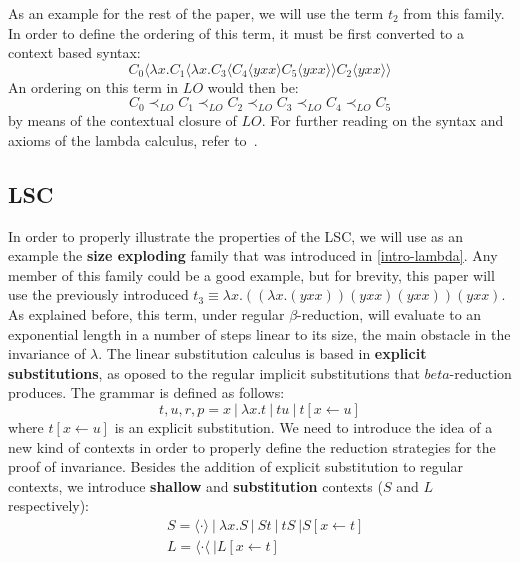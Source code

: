 \documentclass[12pt]{article}
\begin{document}
As an example for the rest of the paper, we will use the term $t_{2}$ from this family. In order to define the ordering of this term, it must be first converted to a context based syntax:
$$C_{0} \langle \lambda x. C_{1} \langle \lambda x. C_{3} \langle C_{4} \langle yxx \rangle C_{5} \langle yxx \rangle \rangle C_{2} \langle yxx \rangle \rangle $$
An ordering on this term in $LO$ would then be:
\begin{equation}
 C_{0} \prec_{LO} C_{1} \prec_{LO} C_{2} \prec_{LO} C_{3} \prec_{LO} C_{4} \prec_{LO} C_{5}
\end{equation}
by means of the contextual closure of $LO$.
For further reading on the syntax and axioms of the lambda calculus, refer to~\cite{barendregt1984lambda}.
\subsection{LSC}
In order to properly illustrate the properties of the LSC, we will use as an example the \textbf{size exploding} family that was introduced in \ref{intro-lambda}. Any member of this family could be a good example, but for brevity, this paper will use the previously introduced $t_{3} \equiv \lambda x.((\lambda x. (yxx))(yxx)(yxx))(yxx)$. As explained before, this term, under regular $\beta$-reduction, will evaluate to an exponential length in a number of steps linear to its size, the main obstacle in the invariance of $\lambda$.
The linear substitution calculus is based in \textbf{explicit substitutions}, as oposed to the regular implicit substitutions that $beta$-reduction produces. The grammar is defined as follows:
\begin{equation}
  t, u, r, p = x \ | \ \lambda x.t \ | \ tu \ | \ t[x \leftarrow u]
\end{equation}
where $t[x \leftarrow u]$ is an explicit substitution.
We need to introduce the idea of a new kind of contexts in order to properly define the reduction strategies for the proof of invariance. Besides the addition of explicit substitution to regular contexts, we introduce \textbf{shallow} and \textbf{substitution} contexts ($S$ and $L$ respectively):
\begin{equation}
  \begin{split}
    &S = \langle \cdot \rangle \ | \ \lambda x.S \ | \ St \ | \ tS \ | S[x \leftarrow t] \\
    &L = \langle \cdot \langle \ | L[x \leftarrow t]
  \end{split}
\end{equation}
\end{document}
